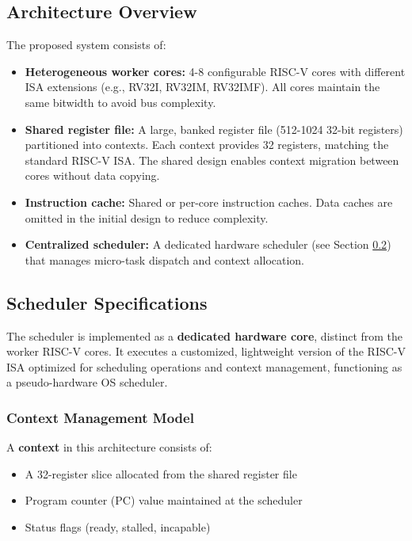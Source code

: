 \documentclass[12pt,letterpaper]{report}
\theoremstyle{definition}
\theoremstyle{plain}
\begin{document}
\subsection{Architecture Overview}
The proposed system consists of:
\begin{itemize}
    \item \textbf{Heterogeneous worker cores:} 4-8 configurable RISC-V cores with 
          different ISA extensions (e.g., RV32I, RV32IM, RV32IMF). All cores maintain 
          the same bitwidth to avoid bus complexity.
    \item \textbf{Shared register file:} A large, banked register file (512-1024 
          32-bit registers) partitioned into contexts. Each context provides 32 registers, 
          matching the standard RISC-V ISA. The shared design enables context migration 
          between cores without data copying.
    \item \textbf{Instruction cache:} Shared or per-core instruction caches. Data 
          caches are omitted in the initial design to reduce complexity.
    \item \textbf{Centralized scheduler:} A dedicated hardware scheduler (see Section 
          \ref{sec:scheduler_spec}) that manages micro-task dispatch and context allocation.
\end{itemize}
\subsection{Scheduler Specifications}
\label{sec:scheduler_spec}
The scheduler is implemented as a \textbf{dedicated hardware core}, distinct from the
worker RISC-V cores. It executes a customized, lightweight version of the RISC-V ISA 
optimized for scheduling operations and context management, functioning as a 
pseudo-hardware OS scheduler.

\subsubsection{Context Management Model}
A \textbf{context} in this architecture consists of:
\begin{itemize}
    \item A 32-register slice allocated from the shared register file
    \item Program counter (PC) value maintained at the scheduler
    \item Status flags (ready, stalled, incapable)
\end{itemize}
\end{document}
